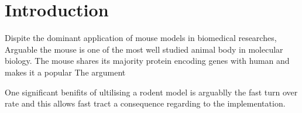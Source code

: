 \section{Introduction}

Dispite the dominant application of mouse models in biomedical researches, Arguable the mouse is one of the most well studied animal body in molecular biology. 
The mouse shares its majority protein encoding genes with human and makes it a popular  
The argument 

One significant benifits of ultilising a rodent model is arguablly the fast turn over rate and this allows fast tract a consequence regarding to the implementation. \cite{Vandamme_2014}